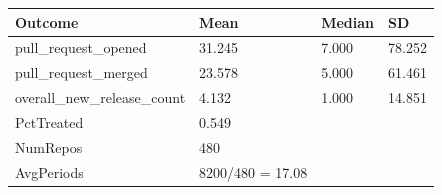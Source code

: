 
\begin{tabular}{llll}
\toprule
Outcome & Mean & Median & SD\\
\midrule
pull\_request\_opened & 31.245 & 7.000 & 78.252\\
pull\_request\_merged & 23.578 & 5.000 & 61.461\\
overall\_new\_release\_count & 4.132 & 1.000 & 14.851\\
\midrule
PctTreated & 0.549 &  &  \\
NumRepos & 480 &  &  \\
AvgPeriods & 8200/480 = 17.08 &  &  \\
\bottomrule
\end{tabular}
